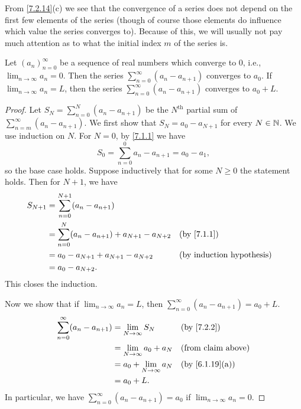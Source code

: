 \begin{note}
  From \cref{7.2.14}(c) we see that the convergence of a series does not depend on the first few elements of the series
  (though of course those elements do influence which value the series converges to).
  Because of this, we will usually not pay much attention as to what the initial index \(m\) of the series is.
\end{note}

\begin{lem}\label{7.2.15}
  Let \((a_n)_{n = 0}^\infty\) be a sequence of real numbers which converge to \(0\), i.e., \(\lim_{n \to \infty} a_n = 0\).
  Then the series \(\sum_{n = 0}^\infty (a_n - a_{n + 1})\) converges to \(a_0\).
  If \(\lim_{n \to \infty} a_n = L\), then the series \(\sum_{n = 0}^\infty (a_n - a_{n + 1})\) converges to \(a_0 + L\).
\end{lem}

\begin{proof}
  Let \(S_N = \sum_{n = 0}^N (a_n - a_{n + 1})\) be the \(N^{\text{th}}\) partial sum of \(\sum_{n = m}^\infty (a_n - a_{n + 1})\).
  We first show that \(S_N = a_0 - a_{N + 1}\) for every \(N \in \mathbb{N}\).
  We use induction on \(N\).
  For \(N = 0\), by \cref{7.1.1} we have
  \[
    S_0 = \sum_{n = 0}^0 a_n - a_{n + 1} = a_0 - a_1,
  \]
  so the base case holds.
  Suppose inductively that for some \(N \geq 0\) the statement holds.
  Then for \(N + 1\), we have
  \begin{align*}
    S_{N + 1} & = \sum_{n = 0}^{N + 1} (a_n - a_{n + 1})                                   \\
              & = \sum_{n = 0}^N (a_n - a_{n + 1}) + a_{N + 1} - a_{N + 2} &  & \by{7.1.1} \\
              & = a_0 - a_{N + 1} + a_{N + 1} - a_{N + 2}                  &  & \byIH      \\
              & = a_0 - a_{N + 2}.
  \end{align*}
  This closes the induction.

  Now we show that if \(\lim_{n \to \infty} a_n = L\), then \(\sum_{n = 0}^\infty (a_n - a_{n + 1}) = a_0 + L\).
  \begin{align*}
    \sum_{n = 0}^\infty (a_n - a_{n + 1}) & = \lim_{N \to \infty} S_N       &  & \by{7.2.2}                \\
                                          & = \lim_{N \to \infty} a_0 + a_N &  & \text{(from claim above)} \\
                                          & = a_0 + \lim_{N \to \infty} a_N &  & \by{6.1.19}[a]            \\
                                          & = a_0 + L.
  \end{align*}
  In particular, we have \(\sum_{n = 0}^\infty (a_n - a_{n + 1}) = a_0\) if \(\lim_{n \to \infty} a_n = 0\).
\end{proof}

